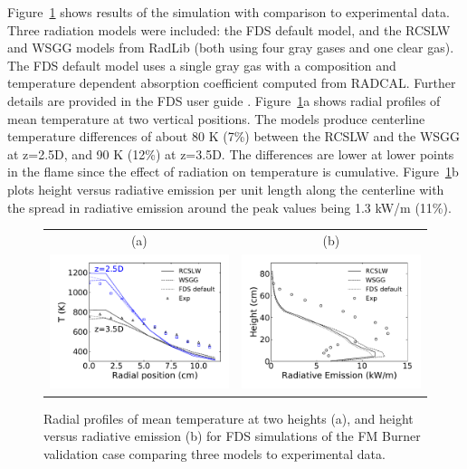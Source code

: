 \documentclass[preprint,12pt]{elsarticle}
\begin{document}
Figure~\ref{f:fds} shows results of the simulation with comparison to experimental data. Three radiation models were included: the FDS default model, and the RCSLW and WSGG models from RadLib (both using four gray gases and one clear gas). 
The FDS default model uses a single gray gas with a composition and temperature dependent absorption coefficient computed from RADCAL. Further details are provided in the FDS user guide \cite{FDS}. 
Figure~\ref{f:fds}a shows radial profiles of mean temperature at two vertical positions. The models produce centerline temperature differences of about 80 K (7\%) between the RCSLW and the WSGG at z=2.5D, and 90 K (12\%) at z=3.5D. The differences are lower at lower points in the flame since the effect of radiation on temperature is cumulative. Figure~\ref{f:fds}b plots height versus radiative emission per unit length along the centerline with the spread in radiative emission around the peak values being 1.3 kW/m (11\%).
%
\begin{figure}
    \begin{center}
    \begin{tabular}{c c}
        (a) & (b) \\
        \includegraphics[width=2.5 in]{fig_fds_T_mean.pdf} &
        \includegraphics[width=2.5 in]{fig_fds_rad_mean.pdf}
    \end{tabular}
    \caption{Radial profiles of mean temperature at two heights (a), and height versus radiative emission (b) for FDS simulations of the FM Burner validation case comparing three models to experimental data.}
    \label{f:fds}
    \end{center}
\end{figure}
%
\end{document}
